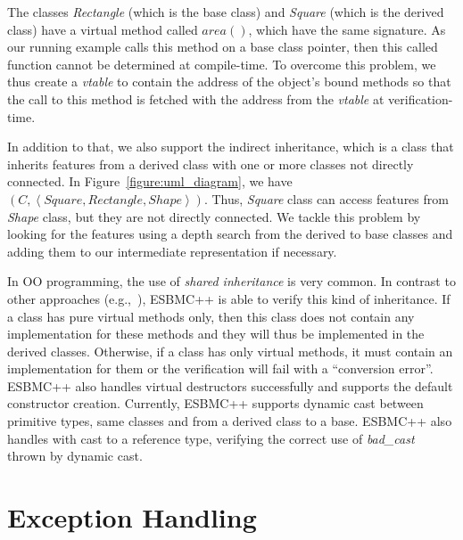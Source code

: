\documentclass[conference]{IEEEtran}
\begin{document}
The classes \textit{Rectangle} (which is the base class)
and \textit{Square} (which is the derived class) have a virtual method
called $area\left(\right)$, which have the same signature. As our running example
calls this method on a base class pointer, then this called function
cannot be determined at compile-time. To overcome this problem,
we thus create a \textit{vtable} to contain the address of the object's bound
methods so that the call to this method is fetched with the address from
the \textit{vtable} at verification-time.

In addition to that, we also support the indirect inheritance,
which is a class that inherits features from a derived class with one
or more classes not directly connected. In Figure~\ref{figure:uml_diagram}, we have
$\left(C, \left\langle Square, Rectangle, Shape \right\rangle \right)$.
Thus, \textit{Square} class can access features from \textit{Shape} class,
but they are not directly connected. We tackle this problem by
looking for the features using a depth search from the derived to base classes
and adding them to our intermediate representation if necessary.

In OO programming, the use of \textit{shared inheritance} is very common.
In contrast to other approaches (e.g.,~\cite{Blanc07}), ESBMC++ is able to
verify this kind of inheritance. If a class has pure virtual methods only,
then this class does not contain any implementation for these methods and they will
thus be implemented in the derived classes. Otherwise, if a class has only virtual
methods, it must contain an implementation for them or the verification will fail
with a ``conversion error''. ESBMC++ also handles virtual destructors successfully
and supports the default constructor creation. Currently, ESBMC++
supports dynamic cast between primitive types, same classes and from a derived
class to a base. ESBMC++ also handles with cast to a reference type, verifying the
correct use of \textit{bad\_cast} thrown by dynamic cast.


\section{Exception Handling}
\label{exception-handling}
\end{document}
